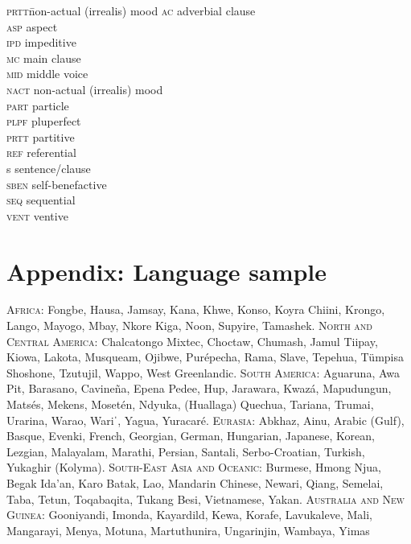 \documentclass[output=paper]{langsci/langscibook}
\begin{document}
\begin{multicols}{2}
\begin{tabbing}
\textsc{prtt}\hspace{5mm}\=non-actual (irrealis) mood\hspace{5mm}\kill
\textsc{ac}  \>adverbial clause                 \\
\textsc{asp} \> aspect                          \\
\textsc{ipd} \> impeditive                      \\
\textsc{mc}  \>main clause                      \\
\textsc{mid} \> middle voice                    \\
\textsc{nact}\>  non-actual (irrealis) mood     \\
\textsc{part}\>  particle                       \\
\textsc{plpf}\>  pluperfect                     \\
\textsc{prtt}\>  partitive                      \\
\textsc{ref} \> referential                     \\
s            \>    sentence/clause              \\
\textsc{sben}\>  self-benefactive               \\
\textsc{seq} \> sequential                      \\
\textsc{vent}\>  ventive                        
\end{tabbing}
\end{multicols}


\section{Appendix: Language sample}
 
\textsc{Africa}: Fongbe, Hausa, Jamsay, Kana, Khwe, Konso, Koyra Chiini, Krongo, Lango, Mayogo, Mbay, Nkore Kiga, Noon, Supyire, Tamashek. 
\textsc{North and Central America}: Chalcatongo Mixtec, Choctaw, Chumash, Jamul Tiipay, Kiowa, Lakota, Musqueam, Ojibwe, Purépecha, Rama, Slave, Tepehua, Tümpisa Shoshone, Tzutujil, Wappo, West Greenlandic. 
\textsc{South America:} Aguaruna, Awa Pit, Barasano, Cavineña, Epena Pedee, Hup, Jarawara, Kwazá, Mapudungun, Matsés, Mekens, Mosetén, Ndyuka, (Huallaga) Quechua, Tariana, Trumai, Urarina, Warao, Wariˈ, Yagua, Yuracaré. 
\textsc{Eurasia:} Abkhaz, Ainu, Arabic (Gulf), Basque, Evenki, French, Georgian, German, Hungarian, Japanese, Korean, Lezgian, Malayalam, Marathi, Persian, Santali, Serbo-Croatian, Turkish, Yukaghir (Kolyma). 
\textsc{South-East Asia and Oceanic:} Burmese, Hmong Njua, Begak Ida’an, Karo Batak, Lao, Mandarin Chinese, Newari, Qiang, Semelai, Taba, Tetun, Toqabaqita, Tukang Besi, Vietnamese, Yakan. 
\textsc{Australia and New Guinea:} Gooniyandi, Imonda, Kayardild, Kewa, Korafe, Lavukaleve, Mali, Mangarayi, Menya, Motuna, Martuthunira, Ungarinjin, Wambaya, Yimas
 
  
\sloppy
\printbibliography[heading=subbibliography,notkeyword=this] 
\end{document}

